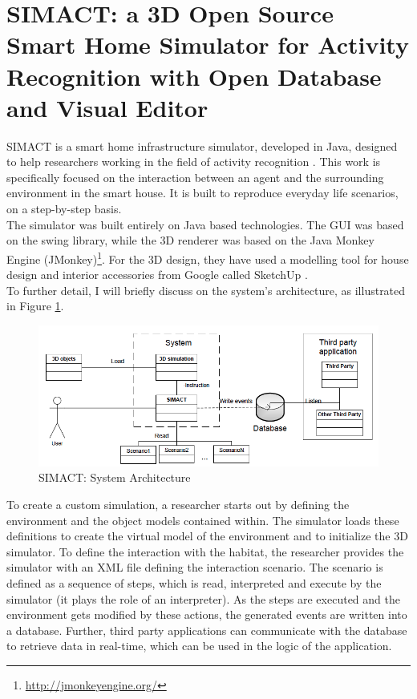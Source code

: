 \section{SIMACT: a 3D Open Source Smart Home Simulator for Activity Recognition with Open Database and Visual Editor}\label{sec:simact}

SIMACT is a smart home infrastructure simulator, developed in Java, designed to help researchers working in the field of activity recognition \cite{bouchard2012simact}. This work is specifically focused on the interaction between an agent and the surrounding environment in the smart house. It is built to reproduce everyday life scenarios, on a step-by-step basis.\\

The simulator was built entirely on Java based technologies. The GUI was based on the swing library, while the 3D renderer was based on the Java Monkey Engine (JMonkey)\footnote{\url{http://jmonkeyengine.org/}}. For the 3D design, they have used a modelling tool for house design and interior accessories from Google called SketchUp \cite{sketchup:online}.\\

To further detail, I will briefly discuss on the system's architecture, as illustrated in Figure \ref{fig:simact_architecture}.

\begin{figure}[H]
	\centering
	\includegraphics[width=\linewidth]{gfx/Chapter2/simact_architecture}
	\caption{SIMACT: System Architecture}
	\label{fig:simact_architecture}
\end{figure}

To create a custom simulation, a researcher starts out by defining the environment and the object models contained within. The simulator loads these definitions to create the virtual model of the environment and to initialize the 3D simulator. To define the interaction with the habitat, the researcher provides the simulator with an XML file defining the interaction scenario. The scenario is defined as a sequence of steps, which is read, interpreted and execute by the simulator (it plays the role of an interpreter). As the steps are executed and the environment gets modified by these actions, the generated events are written into a database. Further, third party applications can communicate with the database to retrieve data in real-time, which can be used in the logic of the application.\\

